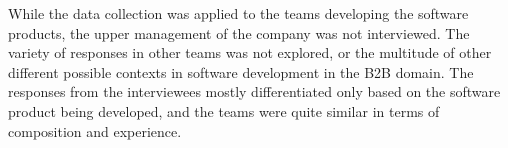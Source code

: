 \documentclass[english]{tktltiki2}
\theoremstyle{definition}
\theoremstyle{remark}
\begin{document}
While the data collection was applied to the teams developing the software products, the upper management of the company was not interviewed. The variety of responses in other teams was not explored, or the multitude of other different possible contexts in software development in the B2B domain. The responses from the interviewees mostly differentiated only based on the software product being developed, and the teams were quite similar in terms of composition and experience.








%
%







\end{document}
